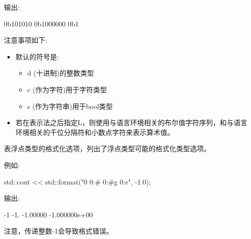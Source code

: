 输出:

\begin{shell}
0b101010 0b1000000 0b1
\end{shell}

注意事项如下:

\begin{itemize}
\item 
默认的符号是:

\begin{itemize}
\item 
d (十进制)的整数类型

\item 
c (作为字符)用于字符类型

\item 
s (作为字符串)用于bool类型
\end{itemize}

\item 
若在表示法之后指定L，则使用与语言环境相关的布尔值字符序列，和与语言环境相关的千位分隔符和小数点字符来表示算术值。
\end{itemize}


表浮点类型的格式化选项，列出了浮点类型可能的格式化类型选项。

例如:

\begin{cpp}
std::cout << std::format("{0} {0:#} {0:#g} {0:e}\n", -1.0);
\end{cpp}

输出:

\begin{shell}
-1 -1. -1.00000 -1.000000e+00
\end{shell}

注意，传递整数-1会导致格式错误。

